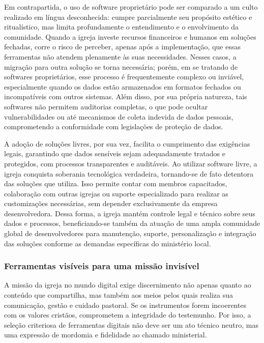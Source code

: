 Em contrapartida, o uso de software proprietário pode ser comparado a um culto realizado em língua desconhecida: cumpre parcialmente seu propósito estético e ritualístico, mas limita profundamente o entendimento e o envolvimento da comunidade. Quando a igreja investe recursos financeiros e humanos em soluções fechadas, corre o risco de perceber, apenas após a implementação, que essas ferramentas não atendem plenamente às suas necessidades. Nesses casos, a migração para outra solução se torna necessária; porém, em se tratando de softwares proprietários, esse processo é frequentemente complexo ou inviável, especialmente quando os dados estão armazenados em formatos fechados ou incompatíveis com outros sistemas. Além disso, por sua própria natureza, tais softwares não permitem auditorias completas, o que pode ocultar vulnerabilidades ou até mecanismos de coleta indevida de dados pessoais, comprometendo a conformidade com legislações de proteção de dados.

A adoção de soluções livres, por sua vez, facilita o cumprimento das exigências legais, garantindo que dados sensíveis sejam adequadamente tratados e protegidos, com processos transparentes e auditáveis. Ao utilizar software livre, a igreja conquista soberania tecnológica verdadeira, tornando-se de fato detentora das soluções que utiliza. Isso permite contar com membros capacitados, colaboração com outras igrejas ou suporte especializado para realizar as customizações necessárias, sem depender exclusivamente da empresa desenvolvedora. Dessa forma, a igreja mantém controle legal e técnico sobre seus dados e processos, beneficiando-se também da atuação de uma ampla comunidade global de desenvolvedores para manutenção, suporte, personalização e integração das soluções conforme as demandas específicas do ministério local.

\subsubsection{Ferramentas visíveis para uma missão invisível}

A missão da igreja no mundo digital exige discernimento não apenas quanto ao conteúdo que compartilha, mas também aos meios pelos quais realiza sua comunicação, gestão e cuidado pastoral. Se os instrumentos forem incoerentes com os valores cristãos, comprometem a integridade do testemunho. Por isso, a seleção criteriosa de ferramentas digitais não deve ser um ato técnico neutro, mas uma expressão de mordomia e fidelidade ao chamado ministerial.

